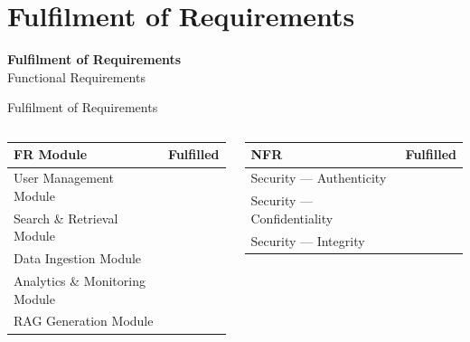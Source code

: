 \documentclass[aspectratio=169,xcolor=dvipsnames]{beamer}
\newcommand{\cmark}{\checkmark}
\begin{document}
\section{Fulfilment of Requirements}

\begin{frame}
  \begin{center}
    {\Large\textbf{Fulfilment of Requirements}}\\[1em]
    {\large Functional Requirements}
  \end{center}
\end{frame}

\begin{frame}{Fulfilment of Requirements}
  \footnotesize
  \begin{columns}[t]
    \begin{table}
      \centering\renewcommand{\arraystretch}{1.1}
      \begin{tabular}{p{.72\linewidth}|c}
        \toprule
        \textbf{FR Module} & \textbf{Fulfilled} \\
        \midrule
        User Management Module         & \textcolor{green!60!black}{\cmark} \\
        Search \& Retrieval Module      & \textcolor{green!60!black}{\cmark} \\
        Data Ingestion Module          & \textcolor{green!60!black}{\cmark} \\
        Analytics \& Monitoring Module & \textcolor{green!60!black}{\cmark} \\
        RAG Generation Module          & \textcolor{green!60!black}{\cmark} \\
        \bottomrule
      \end{tabular}
    \end{table}
    \begin{table}
      \centering\renewcommand{\arraystretch}{1.1}
      \begin{tabular}{p{.72\linewidth}|c}
        \toprule
        \textbf{NFR} & \textbf{Fulfilled} \\
        \midrule
        Security — Authenticity                & \textcolor{green!60!black}{\cmark} \\
        Security — Confidentiality             & \textcolor{green!60!black}{\cmark} \\
        Security — Integrity                   & \textcolor{green!60!black}{\cmark} \\

\end{tabular}
\end{table}
\end{columns}
\end{frame}
\end{document}
